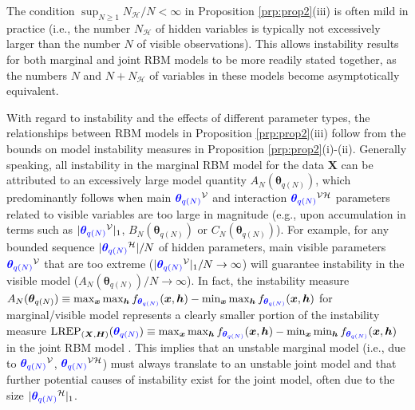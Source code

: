 \documentclass[numbib]{imamat}
\theoremstyle{theorem}
\theoremstyle{lemma}
\theoremstyle{example}
\theoremstyle{corollary}
\theoremstyle{definition}
\theoremstyle{remark}
\theoremstyle{approximation}
\theoremstyle{scheme}
\newcommand{\REP}{\mathrm{LREP}}
\newcommand{\thetaidx}{q(N)}
\newcommand{\thetaN}{\boldsymbol \theta_{\thetaidx}}
\newcommand{\elt}{A_{N}(\thetaN) }
\newcommand{\Gam}{B_{N}(\thetaN) }
\newcommand{\Gamc}{C_{N}(\thetaN) }
\newcommand{\ak}[1]{{\color{blue} #1}}
\let\BeginKnitrBlock\begin \let\EndKnitrBlock\end
\begin{document}
\BeginKnitrBlock{remark}
\iffalse{} {Remark. } \fi{}The condition \(\sup_{N \geq 1} N_{\mathcal{H}}/N<\infty\) in Proposition \ref{prp:prop2}(iii) is often mild in practice (i.e., the number \(N_{\mathcal{H}}\) of hidden variables is typically not excessively larger than the number \(N\) of visible observations). This allows instability results for both marginal and joint RBM models to be more readily stated together, as the numbers \(N\) and \(N+N_{\mathcal{H}}\) of variables in these models become asymptotically equivalent.
\EndKnitrBlock{remark}

\ak{With regard to instability and the effects of different parameter types, the relationships between RBM models in Proposition \ref{prp:prop2}(iii)} follow from the bounds on model instability measures in Proposition \ref{prp:prop2}(i)-(ii). Generally speaking, all instability in the marginal RBM model for the data \(\boldsymbol X\) can be attributed to an excessively large model quantity \(\elt\), which predominantly follows when main \(\ak{\thetaN}^{\mathcal{V}}\) and interaction \(\ak{\thetaN}^{\mathcal{VH}}\) parameters related to visible variables are too large in magnitude (e.g., upon accumulation in terms such as \(|\ak{\thetaN}^{\mathcal{V}}|_1\), \(\Gam\) or \(\Gamc\)). For example, for any bounded sequence \(|\ak{\thetaN}^{\mathcal{H}}|/N\) of hidden parameters, \ak{main visible parameters $\ak{\thetaN}^{\mathcal{V}}$ that are too extreme ($|\ak{\thetaN}^{\mathcal{V}}|_1/N\to \infty$) will guarantee} instability in the visible model (\(\elt/N\to \infty\)). In fact, the instability measure \(\elt \equiv \max_{ \boldsymbol x} \max_{ \boldsymbol h } f_{\ak{\thetaN}} (\boldsymbol x, \boldsymbol h)-\min_{ \boldsymbol x } \max_{ \boldsymbol h }f_{\ak{\thetaN}} (\boldsymbol x, \boldsymbol h)\) for marginal/visible model represents a clearly smaller portion of the instability measure \(\REP_{(\boldsymbol X, \boldsymbol H)}(\ak{\thetaN})\equiv \max_{ \boldsymbol x} \max_{ \boldsymbol h } f_{\ak{\thetaN}} (\boldsymbol x, \boldsymbol h)-\min_{ \boldsymbol x } \min_{ \boldsymbol h } f_{\ak{\thetaN}} (\boldsymbol x, \boldsymbol h)\) in the joint RBM model\ak{. This implies} that an unstable marginal model (i.e., due to \(\ak{\thetaN}^{\mathcal{V}}\), \(\ak{\thetaN}^{\mathcal{VH}}\)) must always translate to an unstable joint model and that further potential causes of instability exist for the joint model, often due to the size \(|\ak{\thetaN}^{\mathcal{H}}|_1\).

\par
\end{document}
